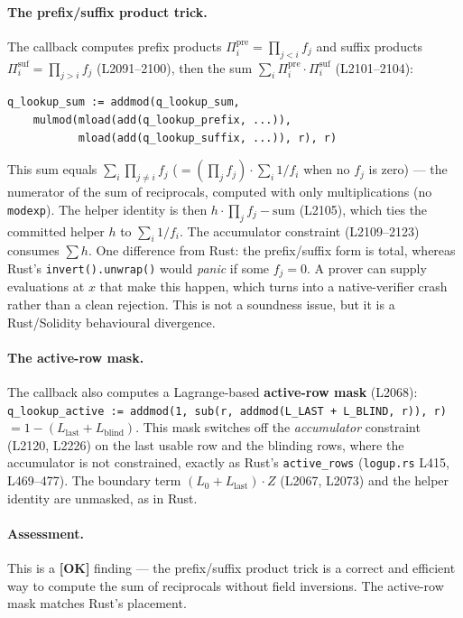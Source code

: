 \paragraph{The prefix/suffix product trick.} The callback computes
prefix products $\Pi^{\text{pre}}_i = \prod_{j<i} f_j$ and
suffix products $\Pi^{\text{suf}}_i = \prod_{j>i} f_j$
(L2091--2100), then the sum
$\sum_i \Pi^{\text{pre}}_i \cdot \Pi^{\text{suf}}_i$
(L2101--2104):
\begin{lstlisting}[style=yul]
q_lookup_sum := addmod(q_lookup_sum,
    mulmod(mload(add(q_lookup_prefix, ...)),
           mload(add(q_lookup_suffix, ...)), r), r)
\end{lstlisting}
This sum equals $\sum_i \prod_{j\ne i} f_j$
($= (\prod_j f_j) \cdot \sum_i 1/f_i$ when no $f_j$ is zero) ---
the numerator of the sum of reciprocals, computed with only
multiplications (no \texttt{modexp}). The helper identity is then
$h\cdot\prod_j f_j - \text{sum}$ (L2105), which ties the committed
helper $h$ to $\sum_i 1/f_i$. The accumulator constraint
(L2109--2123) consumes $\sum h$. One difference from Rust: the
prefix/suffix form is total, whereas Rust's
\texttt{invert().unwrap()} would \emph{panic} if some
$f_j = 0$. A prover can supply evaluations at $x$ that make this
happen, which turns into a native-verifier crash rather than a clean
rejection. This is not a soundness issue, but it is a
Rust/Solidity behavioural divergence.

\paragraph{The active-row mask.} The callback also computes a
Lagrange-based \textbf{active-row mask} (L2068):
\texttt{q\_\allowbreak{}lookup\_\allowbreak{}active := addmod(1, sub(r, addmod(L\_\allowbreak{}LAST +
L\_\allowbreak{}BLIND, r)), r)} $= 1 - (L_{\text{last}} + L_{\text{blind}})$.
This mask switches off the \emph{accumulator} constraint (L2120,
L2226) on the last usable row and the blinding rows, where the
accumulator is not constrained, exactly as Rust's
\texttt{active\_rows} (\texttt{logup.rs} L415, L469--477). The
boundary term $(L_0 + L_{\text{last}})\cdot Z$ (L2067, L2073) and the
helper identity are unmasked, as in Rust.

\paragraph{Assessment.} This is a
\textcolor{tracegreen}{\textbf{[OK]}} finding --- the
prefix/suffix product trick is a correct and efficient way to
compute the sum of reciprocals without field inversions. The
active-row mask matches Rust's placement.

